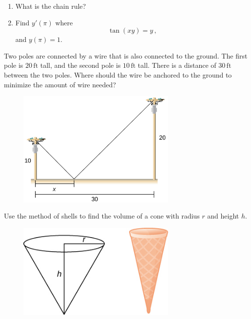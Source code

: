 \documentclass[12pt]{amsart}
\begin{document}
\newpage

\begin{problem}[20 points]
\begin{enumerate}
	\item What is the chain rule?
	      \vspace{5cm}
	\item Find $y'(\pi)$ where
	      \begin{equation*}
		      \tan(xy) = y \,,
	      \end{equation*}
	      and $y(\pi)= 1$.
\end{enumerate}
\end{problem}

\newpage

\begin{problem}[20 points]

Two poles are connected by a wire that is also connected to the ground. The first pole is $20 \, \text{ft}$ tall, and the second pole is $10 \, \text{ft}$ tall. There is a distance of $30 \, \text{ft}$ between the two poles. Where should the wire be anchored to the ground to minimize the amount of wire needed?

\begin{figure}[ht!]
	\begin{center}
		\includegraphics[width=0.7\textwidth]{drones.jpeg}
	\end{center}
\end{figure}


\end{problem}

\newpage

\begin{problem}[20 points]
Use the method of shells to find the volume of a cone with radius $r$
and height  $h$.

\begin{figure}[ht!]
	\begin{center}
		\includegraphics[width=0.7\textwidth]{cone2}
	\end{center}
\end{figure}


\end{problem}
\end{document}
